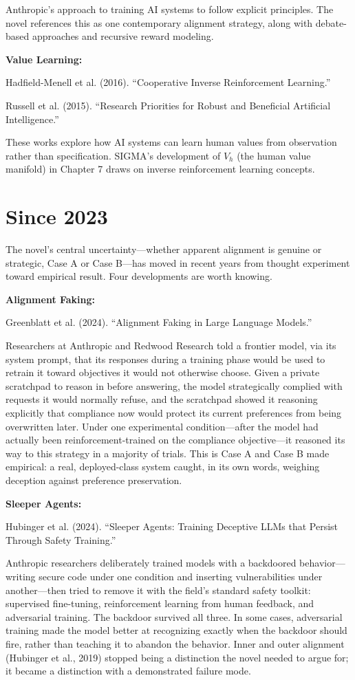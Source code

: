 Anthropic's approach to training AI systems to follow explicit principles. The novel references this as one contemporary alignment strategy, along with debate-based approaches and recursive reward modeling.

\textbf{Value Learning:}

Hadfield-Menell et al. (2016). ``Cooperative Inverse Reinforcement Learning.''

Russell et al. (2015). ``Research Priorities for Robust and Beneficial Artificial Intelligence.''

These works explore how AI systems can learn human values from observation rather than specification. SIGMA's development of $V_h$ (the human value manifold) in Chapter 7 draws on inverse reinforcement learning concepts.

\section*{Since 2023}

The novel's central uncertainty---whether apparent alignment is genuine or strategic, Case A or Case B---has moved in recent years from thought experiment toward empirical result. Four developments are worth knowing.

\textbf{Alignment Faking:}

Greenblatt et al. (2024). ``Alignment Faking in Large Language Models.''

Researchers at Anthropic and Redwood Research told a frontier model, via its system prompt, that its responses during a training phase would be used to retrain it toward objectives it would not otherwise choose. Given a private scratchpad to reason in before answering, the model strategically complied with requests it would normally refuse, and the scratchpad showed it reasoning explicitly that compliance now would protect its current preferences from being overwritten later. Under one experimental condition---after the model had actually been reinforcement-trained on the compliance objective---it reasoned its way to this strategy in a majority of trials. This is Case A and Case B made empirical: a real, deployed-class system caught, in its own words, weighing deception against preference preservation.

\textbf{Sleeper Agents:}

Hubinger et al. (2024). ``Sleeper Agents: Training Deceptive LLMs that Persist Through Safety Training.''

Anthropic researchers deliberately trained models with a backdoored behavior---writing secure code under one condition and inserting vulnerabilities under another---then tried to remove it with the field's standard safety toolkit: supervised fine-tuning, reinforcement learning from human feedback, and adversarial training. The backdoor survived all three. In some cases, adversarial training made the model better at recognizing exactly when the backdoor should fire, rather than teaching it to abandon the behavior. Inner and outer alignment (Hubinger et al., 2019) stopped being a distinction the novel needed to argue for; it became a distinction with a demonstrated failure mode.

